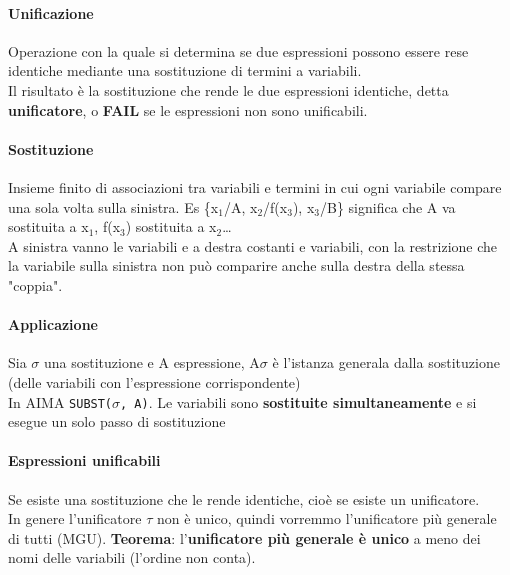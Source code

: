\documentclass[10pt]{book}
\begin{document}
\paragraph{Unificazione} Operazione con la quale si determina se due espressioni possono essere rese identiche mediante una sostituzione di termini a variabili.\\
Il risultato è la sostituzione che rende le due espressioni identiche, detta \textbf{unificatore}, o \textbf{FAIL} se le espressioni non sono unificabili.
\paragraph{Sostituzione} Insieme finito di associazioni tra variabili e termini in cui ogni variabile compare una sola volta sulla sinistra. Es \{x$_1$/A, x$_2$/f(x$_3$), x$_3$/B\} significa che A va sostituita a x$_1$, f(x$_3$) sostituita a x$_2$\ldots\\
A sinistra vanno le variabili e a destra costanti e variabili, con la restrizione che la variabile sulla sinistra non può comparire anche sulla destra della stessa "coppia".
\paragraph{Applicazione} Sia $\sigma$ una sostituzione e A espressione, A$\sigma$ è l'istanza generala dalla sostituzione (delle variabili con l'espressione corrispondente)\\
In AIMA \texttt{SUBST($\sigma$, A)}. Le variabili sono \textbf{sostituite simultaneamente} e si esegue un solo passo di sostituzione
\paragraph{Espressioni unificabili} Se esiste una sostituzione che le rende identiche, cioè se esiste un unificatore.\\
In genere l'unificatore $\tau$ non è unico, quindi vorremmo l'unificatore più generale di tutti (MGU). \textbf{Teorema}: l'\textbf{unificatore più generale è unico} a meno dei nomi delle variabili (l'ordine non conta).
\end{document}
